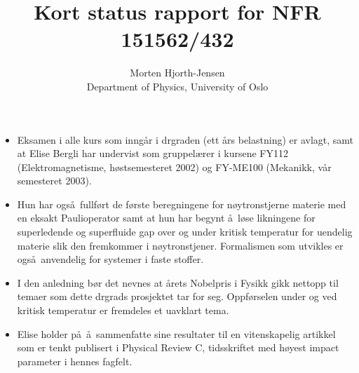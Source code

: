\documentclass{article}
\begin{document}
\title{Kort status rapport for NFR 151562/432}

\author{Morten Hjorth-Jensen\\ Department of Physics, University of Oslo} 

\maketitle  

\begin{itemize}
\item Eksamen i alle kurs som inng\aa r i drgraden (ett \aa rs belastning)
er avlagt, samt at Elise Bergli  har undervist som gruppel\ae rer i kursene 
FY112 (Elektromagnetisme, h\o stsemesteret 2002) 
og FY-ME100 (Mekanikk, v\aa r semesteret 2003).
\item Hun har ogs\aa\ fullf\o rt de f\o rste beregningene for n\o ytronstjerne
materie med en eksakt Paulioperator samt at hun  har begynt \aa\ l\o se
likningene for superledende og superfluide 
gap over og under kritisk temperatur for uendelig
materie slik den fremkommer i n\o ytronstjener.
Formalismen som utvikles er ogs\aa\ anvendelig for systemer i faste stoffer.
\item I den anledning b\o r det nevnes at \aa rets Nobelpris i Fysikk gikk nettopp
til temaer som dette drgrads prosjektet tar for seg. Oppf\o rselen under og ved
kritisk temperatur er fremdeles et uavklart tema.
\item Elise holder p\aa\ \aa\ sammenfatte sine resultater til en vitenskapelig
artikkel som er tenkt publisert i Physical Review C, tidsskriftet med h\o yest
impact parameter i hennes fagfelt.
\end{itemize}
\end{document}
